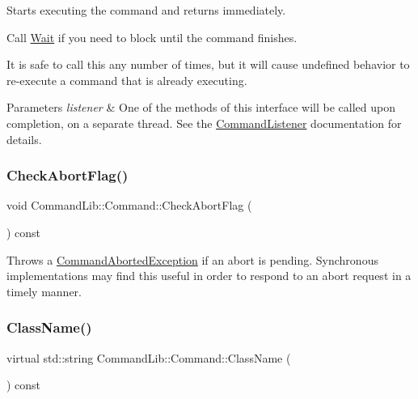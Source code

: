 Starts executing the command and returns immediately. 

Call \mbox{\hyperlink{class_command_lib_1_1_command_ac4d49fbf9bbcc543fb57e4b04edf1ddb}{Wait}} if you need to block until the command finishes. 

It is safe to call this any number of times, but it will cause undefined behavior to re-\/execute a command that is already executing. 


\begin{DoxyParams}{Parameters}
{\em listener} & One of the methods of this interface will be called upon completion, on a separate thread. See the \mbox{\hyperlink{class_command_lib_1_1_command_listener}{Command\+Listener}} documentation for details. \\
\hline
\end{DoxyParams}
\mbox{\label{class_command_lib_1_1_command_a0e9fe77b6976159e86428ebcaeee0e82}} 
\subsubsection{\texorpdfstring{Check\+Abort\+Flag()}{CheckAbortFlag()}}
{\footnotesize\ttfamily void Command\+Lib\+::\+Command\+::\+Check\+Abort\+Flag (\begin{DoxyParamCaption}{ }\end{DoxyParamCaption}) const\hspace{0.3cm}{\ttfamily [protected]}}



Throws a \mbox{\hyperlink{class_command_lib_1_1_command_aborted_exception}{Command\+Aborted\+Exception}} if an abort is pending. Synchronous implementations may find this useful in order to respond to an abort request in a timely manner. 

\mbox{\label{class_command_lib_1_1_command_a96f8ac531b436a41b21252fa2e17fd79}} 
\subsubsection{\texorpdfstring{Class\+Name()}{ClassName()}}
{\footnotesize\ttfamily virtual std\+::string Command\+Lib\+::\+Command\+::\+Class\+Name (\begin{DoxyParamCaption}{ }\end{DoxyParamCaption}) const\hspace{0.3cm}{\ttfamily [pure virtual]}}



